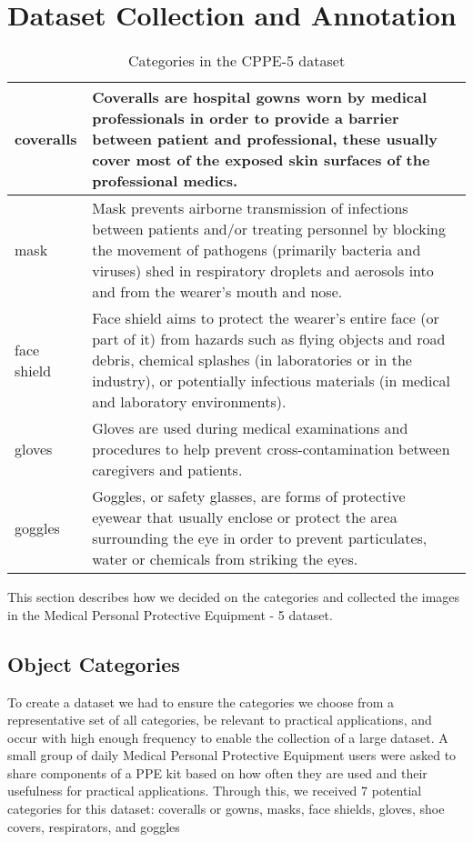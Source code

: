 \documentclass{article}
\begin{document}
\section{Dataset Collection and Annotation}
\label{Dataset Collection and Annotation}

\begin{table}
 \caption{Categories in the CPPE-5 dataset}
  \centering
    \begin{tabularx}{\textwidth}{l|X}
    \toprule
    coveralls   & Coveralls are hospital gowns worn by medical professionals in order to provide a barrier between patient and professional, these usually cover most of the exposed skin surfaces of the professional medics. \\ \hline
    mask        & Mask prevents airborne transmission of infections between patients and/or treating personnel by blocking the movement of pathogens (primarily bacteria and viruses) shed in respiratory droplets and aerosols into and from the wearer's mouth and nose. \\ \hline
    face shield & Face shield aims to protect the wearer's entire face (or part of it) from hazards such as flying objects and road debris, chemical splashes (in laboratories or in the industry), or potentially infectious materials (in medical and laboratory environments). \\ \hline
    gloves      & Gloves are used during medical examinations and procedures to help prevent cross-contamination between caregivers and patients. \\ \hline
    goggles     & Goggles, or safety glasses, are forms of protective eyewear that usually enclose or protect the area surrounding the eye in order to prevent particulates, water or chemicals from striking the eyes. \\
    \bottomrule
  \end{tabularx}
  \label{tab:categories}
\end{table}

This section describes how we decided on the categories and collected the images in the Medical Personal Protective Equipment - 5 dataset.

\subsection{Object Categories}
\label{Object Categories}

To create a dataset we had to ensure the categories we choose from a representative set of all categories, be relevant to practical applications, and occur with high enough frequency to enable the collection of a large dataset. A small group of daily Medical Personal Protective Equipment users were asked to share components of a PPE kit based on how often they are used and their usefulness for practical applications. Through this, we received 7 potential categories for this dataset: coveralls or gowns, masks, face shields, gloves, shoe covers, respirators, and goggles
\end{document}
